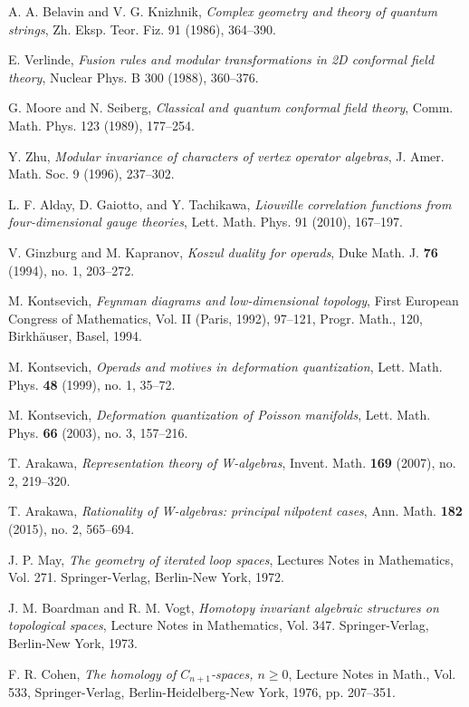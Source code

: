\begin{thebibliography}{99}
 A. A. Belavin and V. G. Knizhnik, \emph{Complex geometry and theory of quantum strings}, 
  Zh. Eksp. Teor. Fiz. 91 (1986), 364--390.
  
 E. Verlinde, \emph{Fusion rules and modular transformations in 2D conformal field theory}, 
  Nuclear Phys. B 300 (1988), 360--376.

 G. Moore and N. Seiberg, \emph{Classical and quantum conformal field theory}, 
  Comm. Math. Phys. 123 (1989), 177--254.

 Y. Zhu, \emph{Modular invariance of characters of vertex operator algebras}, 
  J. Amer. Math. Soc. 9 (1996), 237--302.

 L. F. Alday, D. Gaiotto, and Y. Tachikawa, \emph{Liouville correlation functions from four-dimensional gauge theories}, 
  Lett. Math. Phys. 91 (2010), 167--197.

 V. Ginzburg and M. Kapranov, \emph{Koszul duality for operads}, Duke Math. J. \textbf{76} (1994), no. 1, 203--272.

 M. Kontsevich, \emph{Feynman diagrams and low-dimensional topology}, First European Congress of Mathematics, Vol. II (Paris, 1992), 97--121, Progr. Math., 120, Birkhäuser, Basel, 1994.

 M. Kontsevich, \emph{Operads and motives in deformation quantization}, Lett. Math. Phys. \textbf{48} (1999), no. 1, 35--72.

 M. Kontsevich, \emph{Deformation quantization of Poisson manifolds}, Lett. Math. Phys. \textbf{66} (2003), no. 3, 157--216.

 T. Arakawa, \emph{Representation theory of W-algebras}, Invent. Math. \textbf{169} (2007), no. 2, 219--320.

 T. Arakawa, \emph{Rationality of W-algebras: principal nilpotent cases}, Ann. Math. \textbf{182} (2015), no. 2, 565--694.

 J. P. May, \emph{The geometry of iterated loop spaces}, Lectures Notes in Mathematics, Vol. 271. Springer-Verlag, Berlin-New York, 1972.

 J. M. Boardman and R. M. Vogt, \emph{Homotopy invariant algebraic structures on topological spaces}, Lecture Notes in Mathematics, Vol. 347. Springer-Verlag, Berlin-New York, 1973.

 F. R. Cohen, \emph{The homology of $C_{n+1}$-spaces, $n \geq 0$}, Lecture Notes in Math., Vol. 533, Springer-Verlag, Berlin-Heidelberg-New York, 1976, pp. 207--351.


\end{thebibliography}
